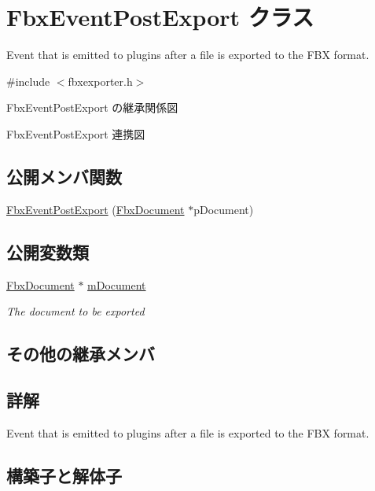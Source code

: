 \hypertarget{class_fbx_event_post_export}{}\section{Fbx\+Event\+Post\+Export クラス}
\label{class_fbx_event_post_export}


Event that is emitted to plugins after a file is exported to the F\+BX format.  




{\ttfamily \#include $<$fbxexporter.\+h$>$}



Fbx\+Event\+Post\+Export の継承関係図


Fbx\+Event\+Post\+Export 連携図
\subsection*{公開メンバ関数}
\begin{DoxyCompactItemize}
\item 
\hyperlink{class_fbx_event_post_export_ab35efa8c72530d563f35128018c9bfcc}{Fbx\+Event\+Post\+Export} (\hyperlink{class_fbx_document}{Fbx\+Document} $\ast$p\+Document)
\end{DoxyCompactItemize}
\subsection*{公開変数類}
\begin{DoxyCompactItemize}
\item 
\hyperlink{class_fbx_document}{Fbx\+Document} $\ast$ \hyperlink{class_fbx_event_post_export_aca668d4ffcd12dc1b6455bb5165fb2f5}{m\+Document}
\begin{DoxyCompactList}\small\item\em The document to be exported \end{DoxyCompactList}\end{DoxyCompactItemize}
\subsection*{その他の継承メンバ}


\subsection{詳解}
Event that is emitted to plugins after a file is exported to the F\+BX format. 

\subsection{構築子と解体子}
\mbox{\label{class_fbx_event_post_export_ab35efa8c72530d563f35128018c9bfcc}} 
